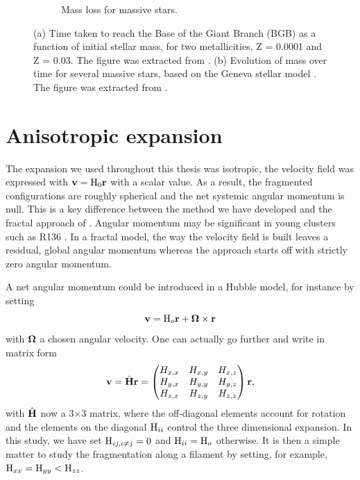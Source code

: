 \begin{figure}
\begin{subfigure}[b]{0.38\textwidth}
        \caption{Mass loss for massive stars.}
        \label{Fig:7_stellarlifetime_weidner}
    \end{subfigure}
     \caption[Stellar evolution models]{(a) Time taken to reach the Base of the Giant Branch (BGB) as a function of initial stellar mass, for two metallicities, Z = 0.0001 and Z = 0.03. The figure was extracted from \cite{Hurley2000}. (b) Evolution of mass over time for several massive stars, based on the Geneva stellar model \citep{Schaller1992}. The figure was extracted from \cite{Weidner2006}. }
     \label{Fig:7_stellarlifetime}
\end{figure}




\section{Anisotropic expansion}

The \HubLem expansion we used throughout this thesis was isotropic, the velocity field was expressed with $\bold{v} = {\textrm{H}}_0 \bold{r}$ with \tHub a scalar value. As a result, the fragmented configurations are roughly spherical and the net systemic angular momentum is null. This is a key difference between the method we have developed and the fractal approach of \cite{Goodwin2004}. Angular momentum may be significant in young clusters such as R136 \citep{Henault-Brunet2012}. In a fractal model, the way the velocity field is built leaves a residual, global angular momentum whereas the \HubLem approach starts off with strictly zero angular momentum.

 A net angular momentum could be introduced in a Hubble model, for instance by setting 
\begin{equation}
\bold{v} = {\textrm{H}}_o \bold{r} + \bold{\Omega} \times \bold{r}
\end{equation} 
with $\bold{\Omega}$ a chosen angular velocity. One can actually go further and write in matrix form
\begin{equation}
\bold{v} = \hat{\bold{H}} \bold{r} = \left(\begin{matrix}
H_{x,x} & H_{x,y} & H_{x,z}\\
H_{y,x} & H_{y,y} & H_{y,z}\\
H_{z,x} & H_{z,y} & H_{z,z}\\
\end{matrix}\right) \bold{r},
\end{equation}
with $\hat{\bold{H}}$ now a 3$\times$3 matrix, where the off-diagonal elements account for rotation and the elements on the diagonal ${\textrm{H}}_{ii}$ control the three dimensional expansion. In this study, we have set ${\textrm{H}}_{ij,i\ne j}=0$ and ${\textrm{H}}_{ii}={\textrm{H}}_o$ otherwise. It is then a simple matter to study the fragmentation along a filament by setting, for example, ${\textrm{H}}_{xx}={\textrm{H}}_{yy} < {\textrm{H}}_{zz}$. 


